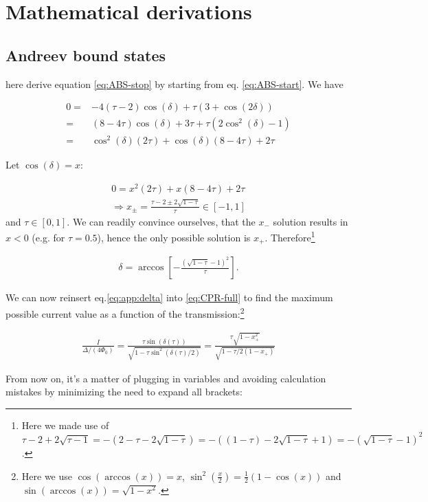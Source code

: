 \chapter{Mathematical derivations}
\label{app:eqs}
\clearpage
\section{Andreev bound states}

 here derive equation \ref{eq:ABS-stop} by starting from eq. \ref{eq:ABS-start}. We have

\begin{align}
0 = &-4(\tau-2)\cos(\delta) +\tau(3+\cos(2\delta)) \\
= &(8-4\tau)\cos(\delta)+3\tau+\tau(2\cos^2(\delta)-1) \\
= &\cos^2(\delta)(2\tau)+\cos(\delta)(8-4\tau)+2\tau
\end{align}

Let $\cos(\delta)=x$:

\begin{eqnarray}
0=x^2(2\tau)+x(8-4\tau)+2\tau \\
\Rightarrow x_{\pm}=\frac{\tau-2\pm2\sqrt{1-\tau}}{\tau} \in [-1,1]
\end{eqnarray}
and $\tau\in [0,1]$. We can readily convince ourselves, that the $x_{-}$ solution results in $x<0$ (e.g. for $\tau=0.5$), hence the only possible solution is $x_{+}$. Therefore\footnote{Here we made use of $\tau-2+2\sqrt{\tau-1}=-(2-\tau-2\sqrt{1-\tau})=-((1-\tau)-2\sqrt{1-\tau}+1)=-(\sqrt{1-\tau}-1)^2$.}

\begin{eqnarray}
\delta=\arccos\left[ - \frac{(\sqrt{1-\tau}-1)^2}{\tau} \right].
\label{eq:app:delta}
\end{eqnarray}

We can now reinsert eq.\ref{eq:app:delta} into \ref{eq:CPR-full} to find the maximum possible current value as a function of the transmission:\footnote{Here we use $\cos(\arccos(x))=x$, $\sin^2( \frac{x}{2} )=\frac{1}{2}(1-\cos(x))$ and $\sin(\arccos(x))=\sqrt{1-x^2}$.}

\begin{eqnarray}
\frac{I}{\Delta/(4\Phi_0)} = \frac{\tau\sin(\delta(\tau))}{\sqrt{1-\tau\sin^2(\delta(\tau)/2)}} = \frac{\tau\sqrt{1-x_{+}^2}}{\sqrt{1-\tau/2(1-x_{+})}}
\end{eqnarray}

From now on, it's a matter of plugging in variables and avoiding calculation mistakes by minimizing the need to expand all brackets:

